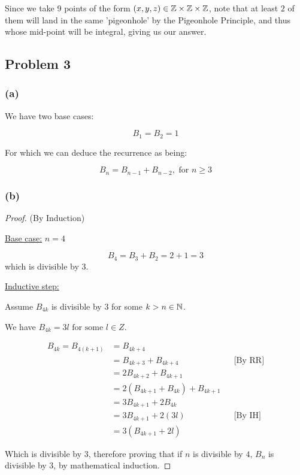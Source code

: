 \documentclass[10pt]{article}
\begin{document}
\noindent
Since we take 9 points of the form $(x, y, z) \in \mathbb{Z} \times \mathbb{Z} \times \mathbb{Z}$, note that at least $2$ of them will land
in the same 'pigeonhole' by the Pigeonhole Principle, and thus whose mid-point will be integral, giving us our answer.

\newpage
\subsection*{Problem 3}

\subsubsection*{(a)}

We have two base cases:

$$B_{1} = B_{2} = 1$$

\noindent
For which we can deduce the recurrence as being:

$$B_{n} = B_{n - 1} + B_{n - 2}, \text{ for }n \ge 3$$

\subsubsection*{(b)}

\begin{proof}
  (By Induction)
  \spacing

  \noindent
  \underline{Base case:} $n = 4$
  \spacing

  \noindent
  $$B_{4} = B_{3} + B_{2} = 2 + 1 = 3$$
  which is divisible by 3.
  \spacing

  \noindent
  \underline{Inductive step:}
  \spacing

  \noindent
  Assume $B_{4k}$ is divisible by 3 for some $k > n \in \mathbb{N}$.
  \spacing

  \noindent
  We have $B_{4k} = 3l \text{ for some } l \in Z$.

  \begin{align*}
    B_{4k} = B_{4(k + 1)} &= B_{4k + 4} \\
      &= B_{4k + 3} + B_{4k + 4} && \text{[By RR]} \\
      &= 2B_{4k + 2} + B_{4k + 1} \\
      &= 2(B_{4k + 1} + B_{4k}) + B_{4k + 1} \\
      &= 3B_{4k + 1} + 2B_{4k} \\
      &= 3B_{4k + 1} + 2(3l) && \text{[By IH]} \\
      &= 3(B_{4k + 1} + 2l)
  \end{align*}
  
  \noindent
  Which is divisible by 3, therefore proving that if $n$ is divisible by $4$, $B_{n}$ is divisible by 3,
  by mathematical induction.
\end{proof}
\end{document}
